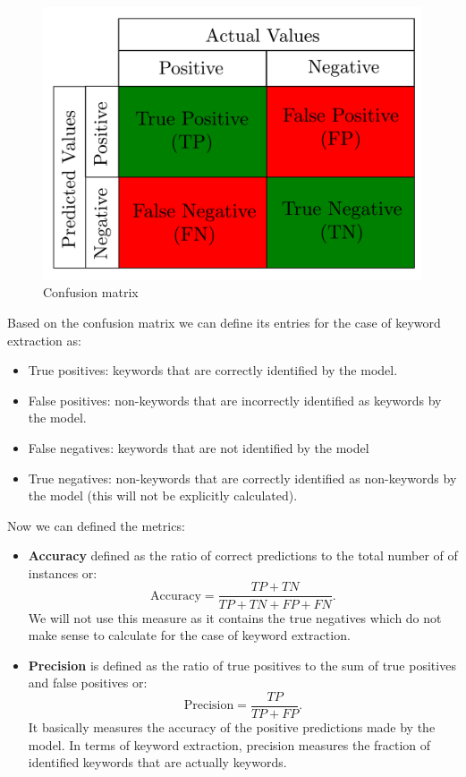 \documentclass[12pt]{article}
\numberwithin{equation}{section}
\begin{document}
\begin{spacing}{1.5}
	\begin{figure}[H]
		\centering
		\includegraphics[scale=0.40]{confusion}		
		\caption{Confusion matrix}
		\label{confusion}
	\end{figure}
	Based on the confusion matrix we can define its entries for the case of keyword extraction as:
	\begin{itemize}
		\item True positives: keywords that are correctly identified by the model.
		\item False positives: non-keywords that are incorrectly identified as keywords by the model.
		\item False negatives: keywords that are not identified by the model
		\item True negatives: non-keywords that are correctly identified as non-keywords by the model (this will not be explicitly calculated). 
	\end{itemize}
	Now we can defined the metrics:
	\begin{itemize}
		\item \textbf{Accuracy} defined as the ratio of correct predictions to the total number of of instances or:
		$$ \text{Accuracy} = \frac{TP + TN}{TP + TN + FP + FN}. $$
		We will not use this measure as it contains the true negatives which do not make sense to calculate for the case of keyword extraction.
		\item \textbf{Precision} is defined as the ratio of true positives to the sum of true positives and false positives or:
		$$ \text{Precision} = \frac{TP}{TP + FP}. $$
		It basically measures the accuracy of the positive predictions made by the model. In terms of keyword extraction, precision measures the fraction of identified keywords that are actually keywords.
		

\end{itemize}
\end{spacing}
\end{document}
